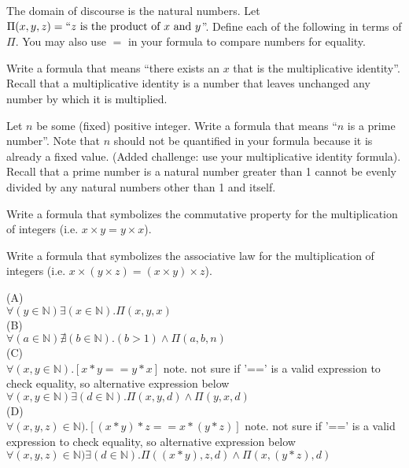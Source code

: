 \documentclass[solution,letterpaper]{cs20}
\begin{document}
    \begin{problem}
        The domain of discourse is the natural numbers. Let $\Pi(x,y,z) = ``z\text{ is the product of } x \text{ and } y$''. Define each of the following in terms of $\Pi$. You may also use $=$ in your formula to compare numbers for equality.

        \subproblem Write a formula that means ``there exists an $x$ that is the multiplicative identity''. Recall that a multiplicative identity is a number that leaves unchanged any number by which it is multiplied.

        \subproblem Let $n$ be some (fixed) positive integer. Write a formula that means ``$n$ is a prime number''. Note that $n$ should not be quantified in your formula because it is already a fixed value. (Added challenge: use your multiplicative identity formula). Recall that a prime number is a natural number greater than 1 cannot be evenly divided by any natural numbers other than 1 and itself.

        \subproblem Write a formula that symbolizes the commutative property for the multiplication of integers (i.e. $x \times y = y \times x$).

        \subproblem Write a formula that symbolizes the associative law for the multiplication of integers (i.e. $x \times (y \times z) = (x \times y) \times z$).

        \begin{solution}
        (A) \\
        $\forall (y \in\mathbb{N}) \exists (x \in\mathbb{N}). \Pi(x, y, x)$ \\
        (B) \\
        $\forall (a \in \mathbb{N}) \nexists (b \in \mathbb{N}). (b > 1) \land \Pi(a, b, n) $\\
        (C) \\
        $\forall (x,y \in \mathbb{N}). [x*y == y*x]$ note. not sure if '==' is a valid expression to check equality, so alternative expression below \\
        $\forall (x,y \in \mathbb{N}) \exists (d \in \mathbb{N}). \Pi(x,y,d) \land \Pi(y,x,d)$ \\
        (D) \\
        $\forall (x,y,z) \in \mathbb{N}). [(x*y)*z == x*(y*z)]$ note. not sure if '==' is a valid expression to check equality, so alternative expression below\\
        $\forall (x,y,z) \in \mathbb{N}) \exists (d \in \mathbb{N}). \Pi((x*y),z,d) \land \Pi(x,(y*z),d)$ \\
        \end{solution}
    \end{problem}
    \newpage
\end{document}
